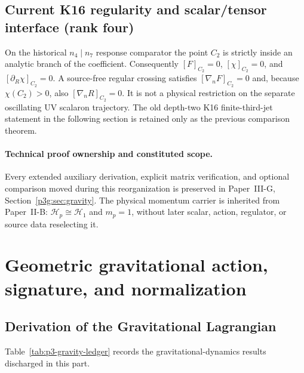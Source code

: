 \documentclass[12pt,a4paper]{article}
\begin{document}
\subsection{Current K16 regularity and scalar/tensor interface (rank four)}
\label{p3e:sec:v2219-k16-regular}
On the historical $n_4\mid n_7$ response comparator the point $C_2$ is strictly inside
an analytic branch of the coefficient. Consequently $[F]_{C_2}=0$,
$[\chi]_{C_2}=0$, and $[\partial_R\chi]_{C_2}=0$. A source-free
regular crossing satisfies $[\nabla_n F]_{C_2}=0$ and, because
$\chi(C_2)>0$, also $[\nabla_n R]_{C_2}=0$.  It is not a physical
restriction on the separate oscillating UV scalaron trajectory.
The old depth-two K16 finite-third-jet statement in the following section
is retained only as the previous comparison theorem.


\paragraph{Technical proof ownership and constituted scope.}
Every extended auxiliary derivation, explicit matrix verification,
and optional comparison moved during this reorganization is
preserved in Paper~III-G, Section~\ref{p3g:sec:gravity}.
The physical momentum carrier is inherited from Paper~II-B:
$\mathcal H_p\cong\mathcal H_1$ and $m_p=1$, without later
scalar, action, regulator, or source data reselecting it.

\section{Geometric gravitational action, signature, and normalization}
\label{paper3e:sec:organized-gravitational}
\subsection{Derivation of the Gravitational Lagrangian}
\label{p3:sec:lagrangian}

Table~\ref{tab:p3-gravity-ledger} records the gravitational-dynamics results discharged in this part.
\end{document}
